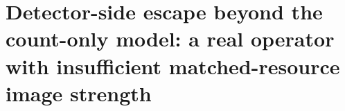 %
%
%
\section{Detector-side escape beyond the count-only model: a real operator with
insufficient matched-resource image strength}
\label{supp:molt}

